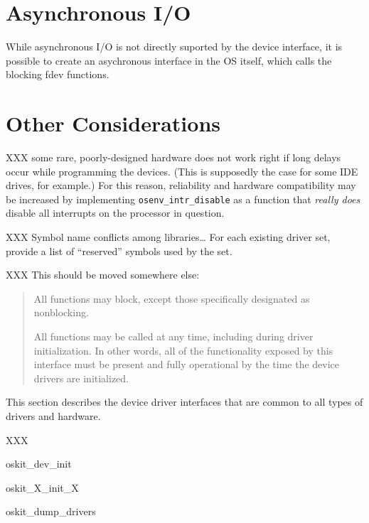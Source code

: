 \section{Asynchronous I/O}

While asynchronous I/O is not directly suported by the \oskit{} device interface,
it is possible to create an asychronous interface in the OS itself,
which calls the blocking fdev functions.


\section{Other Considerations}


XXX some rare, poorly-designed hardware does not work right
if long delays occur while programming the devices.
(This is supposedly the case for some IDE drives, for example.)
For this reason, reliability and hardware compatibility may be increased
by implementing {\tt osenv_intr_disable} as a function
that \emph{really does} disable all interrupts on the processor in question.

XXX Symbol name conflicts among libraries\ldots{}
For each existing driver set,
provide a list of ``reserved'' symbols used by the set.

\vspace*{.2in}
XXX This should be moved somewhere else:
\begin{quote}
All functions may block,
except those specifically designated as nonblocking.

All functions may be called at any time,
including during driver initialization.
In other words, all of the functionality exposed by this interface
must be present and fully operational
by the time the device drivers are initialized.
\end{quote}


This section describes the \oskit{} device driver interfaces
that are common to all types of drivers and hardware.


\begin{apisyn}
\end{apisyn}

XXX

oskit_dev_init

oskit_X_init_X

oskit_dump_drivers

